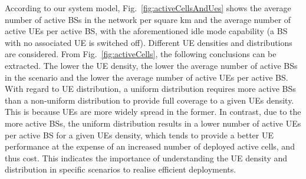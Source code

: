 \documentclass{IEEEtran}
\begin{document}
According to our system model,
Fig.~\ref{fig:activeCellsAndUes} shows
the average number of active \acp{BS} in the network per square km and the average number of active \acp{UE} per active \ac{BS},
with the aforementioned idle mode capability (a \ac{BS} with no associated \ac{UE} is switched off).
Different \ac{UE} densities and distributions are considered.
From Fig.~\ref{fig:activeCells}, the following conclusions can be extracted.
The lower the \ac{UE} density,
the lower the average number of active \acp{BS} in the scenario and the lower the average number of active \acp{UE} per active \ac{BS}.
With regard to \ac{UE} distribution,
a uniform distribution requires more active \acp{BS} than a non-uniform distribution to provide full coverage to a given \acp{UE} density.
This is because \acp{UE} are more widely spread in the former.
In contrast,
due to the more active \acp{BS},
the uniform distribution results in a lower number of active \acp{UE} per active \ac{BS} for a given \acp{UE} density,
which tends to provide a better \ac{UE} performance at the expense of an increased number of deployed active cells,
and thus cost.
This indicates the importance of understanding the \ac{UE} density and distribution in specific scenarios to realise efficient deployments.


\begin{figure*}[t]
  \centering
  \caption{Transmit power per active \ac{BS} and transmit power of the network per km$^2$.
  The \ac{UE} densities are 600, 300 and 100 active \acp{UE} per km$^2$.
  The UE distributions are uniform and non-uniform within the scenario.
  The rest of the parameters are $s=1$, $f=2$\,GHz, $a=1$ and $t=$12\,dB.
  It is important to note that in Fig.~\ref{fig:txPowerCells} there are 6 overlapping curves. This is because the power used by the cell if it is activated does not depend on the UE density. }
\label{fig:txPower}
\end{figure*}
\end{document}
